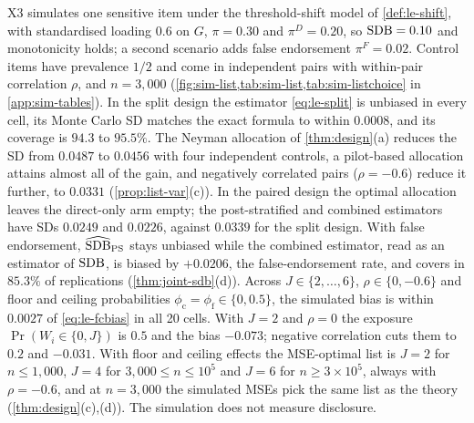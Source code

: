 X3 simulates one sensitive item under the threshold-shift model of \cref{def:le-shift}, with standardised loading $0.6$ on $G$, $\pi=0.30$ and $\pi^D=0.20$, so $\mathrm{SDB}=0.10$ and monotonicity holds; a second scenario adds false endorsement $\pi^F=0.02$. Control items have prevalence $1/2$ and come in independent pairs with within-pair correlation $\rho$, and $n=3{,}000$ (\cref{fig:sim-list,tab:sim-list,tab:sim-listchoice} in \cref{app:sim-tables}). In the split design the estimator \eqref{eq:le-split} is unbiased in every cell, its Monte Carlo SD matches the exact formula to within $0.0008$, and its coverage is $94.3$ to $95.5\%$. The Neyman allocation of \cref{thm:design}(a) reduces the SD from $0.0487$ to $0.0456$ with four independent controls, a pilot-based allocation attains almost all of the gain, and negatively correlated pairs ($\rho=-0.6$) reduce it further, to $0.0331$ (\cref{prop:list-var}(c)). In the paired design the optimal allocation leaves the direct-only arm empty; the post-stratified and combined estimators have SDs $0.0249$ and $0.0226$, against $0.0339$ for the split design. With false endorsement, $\widehat{\mathrm{SDB}}_{\mathrm{PS}}$ stays unbiased while the combined estimator, read as an estimator of $\mathrm{SDB}$, is biased by $+0.0206$, the false-endorsement rate, and covers in $85.3\%$ of replications (\cref{thm:joint-sdb}(d)). Across $J\in\{2,\dots,6\}$, $\rho\in\{0,-0.6\}$ and floor and ceiling probabilities $\phi_{\mathrm c}=\phi_{\mathrm f}\in\{0,0.5\}$, the simulated bias is within $0.0027$ of \eqref{eq:le-fcbias} in all 20 cells. With $J=2$ and $\rho=0$ the exposure $\Pr(W_i\in\{0,J\})$ is $0.5$ and the bias $-0.073$; negative correlation cuts them to $0.2$ and $-0.031$. With floor and ceiling effects the MSE-optimal list is $J=2$ for $n\le1{,}000$, $J=4$ for $3{,}000\le n\le10^5$ and $J=6$ for $n\ge3\times10^5$, always with $\rho=-0.6$, and at $n=3{,}000$ the simulated MSEs pick the same list as the theory (\cref{thm:design}(c),(d)). The simulation does not measure disclosure.

